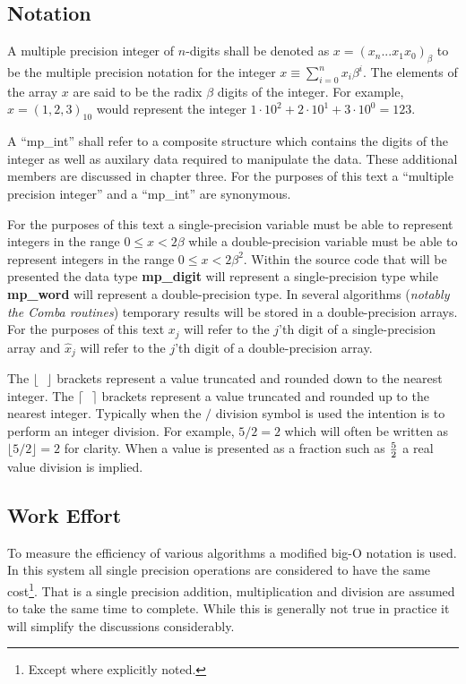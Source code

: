 \documentclass[b5paper]{book}
\begin{document}
\subsection{Notation}
A multiple precision integer of $n$-digits shall be denoted as $x = (x_n ... x_1 x_0)_{ \beta }$ to be the 
multiple precision notation for the integer $x \equiv \sum_{i=0}^{n} x_i\beta^i$.  The elements of the array $x$ are
said to be the radix $\beta$ digits of the integer.  For example, $x = (1,2,3)_{10}$ would represent the 
integer $1\cdot 10^2 + 2\cdot10^1 + 3\cdot10^0 = 123$.  

A ``mp\_int'' shall refer to a composite structure which contains the digits of the integer as well as auxilary data
required to manipulate the data.  These additional members are discussed in chapter three.  For the purposes of this text
a ``multiple precision integer'' and a ``mp\_int'' are synonymous.

   
For the purposes of this text a single-precision variable must be able to represent integers in the range $0 \le x < 2 \beta$ while
a double-precision variable must be able to represent integers in the range $0 \le x < 2 \beta^2$.  Within the source code that will be
presented the data type \textbf{mp\_digit} will represent a single-precision type while \textbf{mp\_word} will represent a 
double-precision type.  In several algorithms (\textit{notably the Comba routines}) temporary results 
will be stored in a double-precision arrays.  For the purposes of this text $x_j$ will refer to the 
$j$'th digit of a single-precision array and $\hat x_j$ will refer to the $j$'th digit of a double-precision
array.

The $\lfloor \mbox{ } \rfloor$ brackets represent a value truncated and rounded down to the nearest integer.  The $\lceil \mbox{ } \rceil$ brackets 
represent a value truncated and rounded up to the nearest integer.  Typically when the $/$ division symbol is used the intention is to perform an integer
division.  For example, $5/2 = 2$ which will often be written as $\lfloor 5/2 \rfloor = 2$ for clarity.  When a value is presented as a fraction
such as $5 \over 2$ a real value division is implied.

\subsection{Work Effort}
To measure the efficiency of various algorithms a modified big-O notation is used.  In this system all 
single precision operations are considered to have the same cost\footnote{Except where explicitly noted.}.  
That is a single precision addition, multiplication and division are assumed to take the same time to 
complete.  While this is generally not true in practice it will simplify the discussions considerably.
\end{document}
